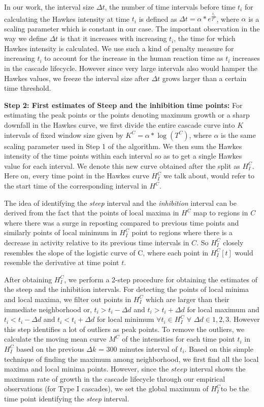 \documentclass[smallextended]{svjour3}       %
\theoremstyle{definition}
\begin{document}
In our work, the interval size $\Delta t$, the number of time intervals before time $t_i $ for calculating the Hawkes intensity at time $t_i $ is defined as $\Delta t = \alpha * e^{\frac{t_i}{T^C}} $, 
where $\alpha $ is a scaling parameter which is constant in our case. The important observation in the way we define $\Delta t$ is that it increases with increasing $t_i $, the time for which Hawkes intensity is calculated. We use such a kind of penalty measure for increasing $t_i $ to account for the increase in the human reaction time as $t_i $ increases in the cascade lifecycle. However since very large intervals also would hamper the Hawkes values, we freeze the interval size after $ \Delta t $ grows larger than a certain time threshold.

\textbf{Step 2: First estimates of Steep and the inhibition time points: } 
For estimating the peak points or the points denoting maximum growth or a sharp downfall in the Hawkes curve, we first divide the entire cascade curve into $K $ intervals of fixed window size given by $K^C = \alpha * \log(T^C) $, where $\alpha $ is the same scaling parameter used in Step 1 of the algorithm. We then sum the Hawkes intensity of the time points within each interval so as to get a single Hawkes value for each interval. We denote this new curve obtained after the split as $H^C_I $. Here on, every time point in the Hawkes curve $ H^C_I $ we talk about, would refer to the start time of the corresponding interval in $H^C$. 

The idea of identifying the \textit{steep} interval and the \textit{inhibition} interval can be derived from the fact that the points of local maxima in $H^C$ map to regions in $C $ where there was a surge in reposting compared to previous time points and similarly points of local minimum in $H^C_I $ point to regions where there is a decrease in activity relative to its previous time intervals in $ C $. So $H^C_I $ closely resembles the slope of the logistic curve of C, where each point in $H_I^C[t] $ would resemble the derivative at time point $t $.

After obtaining $H^C_I $, we perform a 2-step procedure for obtaining the estimates of the steep and the inhibition intervals. For detecting the points of local minima and local maxima, we filter out points in $H^C_I $ which are larger than their immediate neighborhood or, $ t_i > t_i-\Delta d$ and $t_i > t_i + \Delta d $ for local maximum and  $ t_i < t_i-\Delta d$ and $t_i < t_i + \Delta d $ for local minimum $\forall t_i \in H^C_I $ $\forall$ $ \Delta d \in {1, 2, 3} $. However this step identifies a lot of outliers as peak points. To remove the outliers, we calculate the moving mean curve $M^C $ of the intensities for each time point $t_i $ in $H_I^C $ based on the previous $\Delta k$  = 300 minutes interval of $t_i $. Based on this simple technique of finding the maximum among neighborhood, we first find all the local maxima and local minima points. However, since the $steep $ interval shows the maximum rate of growth in the cascade lifecycle through our empirical observations (for Type I cascades), we set the global maximum of $H^C_I $to be the time point identifying the \textit{steep} interval.
\end{document}
